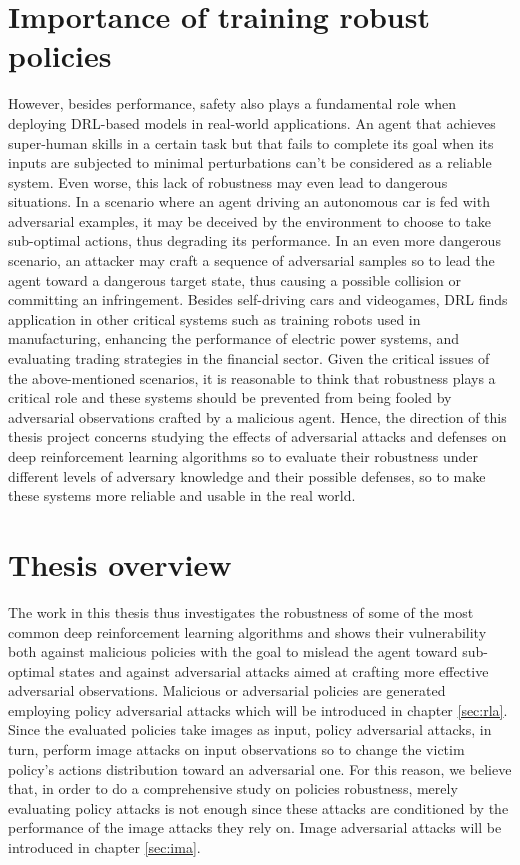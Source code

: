 \section{Importance of training robust policies}
However, besides performance, safety also plays a fundamental role when deploying DRL-based models in real-world applications. An agent that achieves super-human skills in a certain task but that fails to complete its goal when its inputs are subjected to minimal perturbations can't be considered as a reliable system. Even worse, this lack of robustness may even lead to dangerous situations. In a scenario where an agent driving an autonomous car is fed with adversarial examples, it may be deceived by the environment to choose to take sub-optimal actions, thus degrading its performance. In an even more dangerous scenario, an attacker may craft a sequence of adversarial samples so to lead the agent toward a dangerous target state, thus causing a possible collision or committing an infringement. Besides self-driving cars and videogames, DRL finds application in other critical systems such as training robots used in manufacturing, enhancing the performance of electric power systems, and evaluating trading strategies in the financial sector. Given the critical issues of the above-mentioned scenarios, it is reasonable to think that robustness plays a critical role and these systems should be prevented from being fooled by adversarial observations crafted by a malicious agent.  Hence, the direction of this thesis project concerns studying the effects of adversarial attacks and defenses on deep reinforcement learning algorithms so to evaluate their robustness under different levels of adversary knowledge and their possible defenses, so to make these systems more reliable and usable in the real world.

\section{Thesis overview}
The work in this thesis thus investigates the robustness of some of the most common deep reinforcement learning algorithms and shows their vulnerability both against malicious policies with the goal to mislead the agent toward sub-optimal states and against adversarial attacks aimed at crafting more effective adversarial observations. Malicious or adversarial policies are generated employing policy adversarial attacks which will be introduced in chapter \ref{sec:rla}. Since the evaluated policies take images as input, policy adversarial attacks, in turn, perform image attacks on input observations so to change the victim policy's actions distribution toward an adversarial one. For this reason, we believe that, in order to do a comprehensive study on policies robustness, merely evaluating policy attacks is not enough since these attacks are conditioned by the performance of the image attacks they rely on. Image adversarial attacks will be introduced in chapter \ref{sec:ima}.

